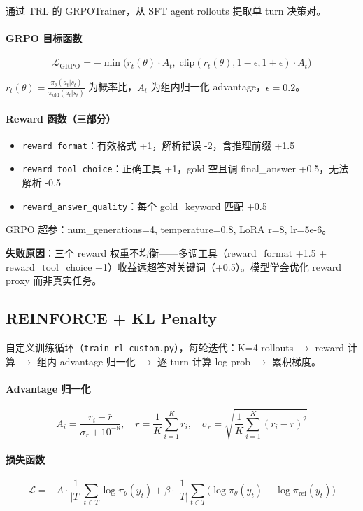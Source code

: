 \documentclass[12pt,a4paper]{ctexart}
\begin{document}
通过 TRL 的 GRPOTrainer，从 SFT agent rollouts 提取单 turn 决策对。

\paragraph{GRPO 目标函数}
$$\mathcal{L}_{\text{GRPO}} = -\min\big(r_t(\theta) \cdot A_t,\; \text{clip}(r_t(\theta), 1-\epsilon, 1+\epsilon) \cdot A_t\big)$$

$r_t(\theta) = \frac{\pi_\theta(a_t|s_t)}{\pi_{\text{old}}(a_t|s_t)}$ 为概率比，$A_t$ 为组内归一化 advantage，$\epsilon = 0.2$。

\paragraph{Reward 函数（三部分）}
\begin{itemize}[nosep]
  \item \texttt{reward\_format}：有效格式 +1，解析错误 -2，含推理前缀 +1.5
  \item \texttt{reward\_tool\_choice}：正确工具 +1，gold 空且调 final\_answer +0.5，无法解析 -0.5
  \item \texttt{reward\_answer\_quality}：每个 gold\_keyword 匹配 +0.5
\end{itemize}

GRPO 超参：num\_generations=4, temperature=0.8, LoRA r=8, lr=5e-6。

\textbf{失败原因}：三个 reward 权重不均衡——多调工具（reward\_format +1.5 + reward\_tool\_choice +1）收益远超答对关键词（+0.5）。模型学会优化 reward proxy 而非真实任务。

\subsection{REINFORCE + KL Penalty}

自定义训练循环（\texttt{train\_rl\_custom.py}），每轮迭代：K=4 rollouts $\rightarrow$ reward 计算 $\rightarrow$ 组内 advantage 归一化 $\rightarrow$ 逐 turn 计算 log-prob $\rightarrow$ 累积梯度。

\paragraph{Advantage 归一化}
$$A_i = \frac{r_i - \bar{r}}{\sigma_r + 10^{-8}}, \quad \bar{r} = \frac{1}{K}\sum_{i=1}^K r_i, \quad \sigma_r = \sqrt{\frac{1}{K}\sum_{i=1}^K (r_i - \bar{r})^2}$$

\paragraph{损失函数}
$$\mathcal{L} = -A \cdot \frac{1}{|T|}\sum_{t \in T}\log\pi_\theta(y_t) + \beta \cdot \frac{1}{|T|}\sum_{t \in T}\big(\log\pi_\theta(y_t) - \log\pi_{\text{ref}}(y_t)\big)$$
\end{document}
